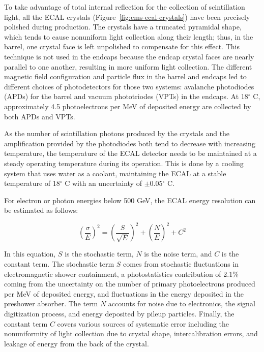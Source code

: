 To take advantage of total internal reflection for the collection of scintillation light, all the ECAL crystals (Figure~\ref{fig:cms-ecal-crystals}) have been precisely polished during production. The crystals have a truncated pyramidal shape, which tends to cause nonuniform light collection along their length; thus, in the barrel, one crystal face is left unpolished to compensate for this effect. This technique is not used in the endcaps because the endcap crystal faces are nearly parallel to one another, resulting in more uniform light collection. The different magnetic field configuration and particle flux in the barrel and endcaps led to different choices of photodetectors for those two systems: avalanche photodiodes (APDs) for the barrel and vacuum phototriodes (VPTs) in the endcaps. At 18$^{\circ}$ C, approximately 4.5 photoelectrons per MeV of deposited energy are collected by both APDs and VPTs. 

As the number of scintillation photons produced by the crystals and the amplification provided by the photodiodes both tend to decrease with increasing temperature, the temperature of the ECAL detector needs to be maintained at a steady operating temperature during its operation. This is done by a cooling system that uses water as a coolant, maintaining the ECAL at a stable temperature of 18$^{\circ}$ C with an uncertainty of $\pm$0.05$^{\circ}$ C.

For electron or photon energies below 500 GeV, the ECAL energy resolution can be estimated as follows:

\begin{equation}
(\frac{\sigma}{E})^2 = (\frac{S}{\sqrt{E}})^2 + (\frac{N}{E})^2 + C^2
\label{eq:ECAL-resolution}
\end{equation}

In this equation, $S$ is the stochastic term, $N$ is the noise term, and $C$ is the constant term. The stochastic term $S$ comes from stochastic fluctuations in electromagnetic shower containment, a photostatistics contribution of 2.1\% coming from the uncertainty on the number of primary photoelectrons produced per MeV of deposited energy, and fluctuations in the energy deposited in the preshower absorber. The term $N$ accounts for noise due to electronics, the signal digitization process, and energy deposited by pileup particles. Finally, the constant term $C$ covers various sources of systematic error including the nonuniformity of light collection due to crystal shape, intercalibration errors, and leakage of energy from the back of the crystal.

